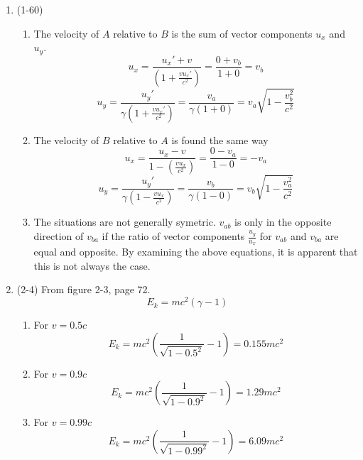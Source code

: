 \documentclass{physicsHW}
\begin{document}
\begin{enumerate}
		\item (1-60)
		\begin{enumerate}
			\item The velocity of $A$ relative to $B$ is the sum of vector components $u_x$ and $u_y$.
			\[
				u_x =  \frac{u_x'+v}{\left(1+\frac{vu_x'}{c^2} \right)} = \frac{0+v_b}{1+0}  = v_b
			\]
			\[
				u_y = \frac{u_y'}{\gamma \left(1+ \frac{vu_x'}{c^2} \right)} = \frac{v_a}{\gamma(1+0)}  = v_a\sqrt{1-\frac{v_b^2}{c^2}} 
			\]
			\item The velocity of $B$ relative to $A$ is found the same way
			\[
				u_x =  \frac{u_x - v}{1 - \left(\frac{vu_x}{c^2} \right) } =  \frac{0-v_a}{1-0} = -v_a 
			\]
			\[
				u_y = \frac{u_y'}{\gamma \left(1 - \frac{vu_x}{c^2} \right) } = \frac{v_b}{\gamma(1-0)}  = v_b\sqrt{1 - \frac{v_a^2}{c^2}}
			\]
			\item The situations are not generally symetric. $v_{ab}$ is only in the opposite direction of $v_{ba}$ if the ratio of vector components $\frac{u_y}{u_x}$ for $v_{ab}$ and $v_{ba}$ are equal and opposite. By examining the above equations, it is apparent that this is not always the case. 
		\end{enumerate}

		\item (2-4) From figure 2-3, page 72.
		\[
			E_k = mc^2 (\gamma -1)
		\]
		\begin{enumerate}
			\item For $v = 0.5c$
			\[
				E_k = mc^2 \left( \frac{1}{\sqrt{1 - 0.5^2}} - 1 \right) =  0.155mc^2
			\]
			\item For $v = 0.9c$
			\[
				E_k = mc^2 \left( \frac{1}{\sqrt{1 - 0.9^2}} - 1 \right) = 1.29mc^2 
			\]
			\item For $v = 0.99c$
			\[
				E_k = mc^2 \left( \frac{1}{\sqrt{1 - 0.99^2}} - 1 \right) = 6.09mc^2 
			\]
			
		\end{enumerate}


	\end{enumerate}
\end{document}
